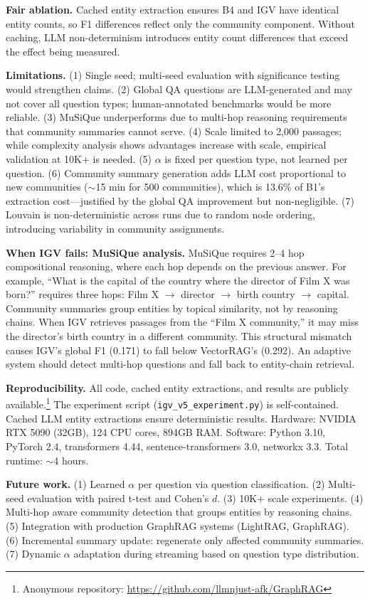 \documentclass[sigconf,anonymous,review]{acmart}
\begin{document}
\textbf{Fair ablation.} Cached entity extraction ensures B4 and IGV have identical entity counts, so F1 differences reflect only the community component. Without caching, LLM non-determinism introduces entity count differences that exceed the effect being measured.

\textbf{Limitations.} (1) Single seed; multi-seed evaluation with significance testing would strengthen claims. (2) Global QA questions are LLM-generated and may not cover all question types; human-annotated benchmarks would be more reliable. (3) MuSiQue underperforms due to multi-hop reasoning requirements that community summaries cannot serve. (4) Scale limited to 2,000 passages; while complexity analysis shows advantages increase with scale, empirical validation at 10K+ is needed. (5) $\alpha$ is fixed per question type, not learned per question. (6) Community summary generation adds LLM cost proportional to new communities ($\sim$15 min for 500 communities), which is 13.6\% of B1's extraction cost---justified by the global QA improvement but non-negligible. (7) Louvain is non-deterministic across runs due to random node ordering, introducing variability in community assignments.

\textbf{When IGV fails: MuSiQue analysis.} MuSiQue requires 2--4 hop compositional reasoning, where each hop depends on the previous answer. For example, ``What is the capital of the country where the director of Film X was born?'' requires three hops: Film X $\to$ director $\to$ birth country $\to$ capital. Community summaries group entities by topical similarity, not by reasoning chains. When IGV retrieves passages from the ``Film X community,'' it may miss the director's birth country in a different community. This structural mismatch causes IGV's global F1 (0.171) to fall below VectorRAG's (0.292). An adaptive system should detect multi-hop questions and fall back to entity-chain retrieval.

\textbf{Reproducibility.} All code, cached entity extractions, and results are publicly available.\footnote{Anonymous repository: \url{https://github.com/llmnjust-afk/GraphRAG}} The experiment script (\texttt{igv\_v5\_experiment.py}) is self-contained. Cached LLM entity extractions ensure deterministic results. Hardware: NVIDIA RTX 5090 (32GB), 124 CPU cores, 894GB RAM. Software: Python 3.10, PyTorch 2.4, transformers 4.44, sentence-transformers 3.0, networkx 3.3. Total runtime: $\sim$4 hours.

\textbf{Future work.} (1) Learned $\alpha$ per question via question classification. (2) Multi-seed evaluation with paired t-test and Cohen's $d$. (3) 10K+ scale experiments. (4) Multi-hop aware community detection that groups entities by reasoning chains. (5) Integration with production GraphRAG systems (LightRAG, GraphRAG). (6) Incremental summary update: regenerate only affected community summaries. (7) Dynamic $\alpha$ adaptation during streaming based on question type distribution.
\end{document}
